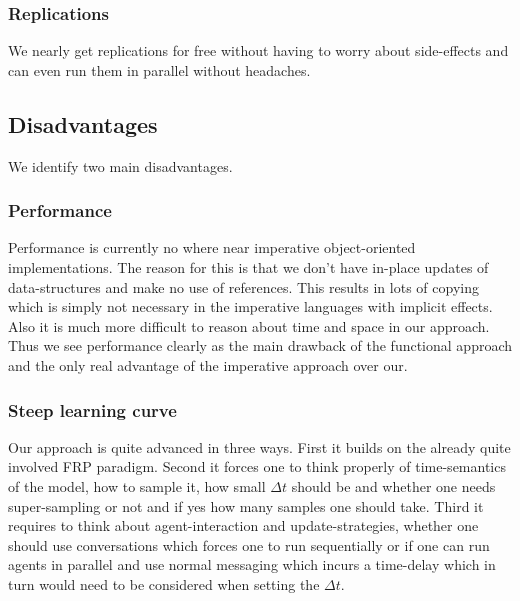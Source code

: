 \subsubsection{Replications}
We nearly get replications for free without having to worry about side-effects and can even run them in parallel without headaches.

\subsection{Disadvantages}
We identify two main disadvantages.

\subsubsection{Performance}
Performance is currently no where near imperative object-oriented implementations. The reason for this is that we don't have in-place updates of data-structures and make no use of references. This results in lots of copying which is simply not necessary in the imperative languages with implicit effects. Also it is much more difficult to reason about time and space in our approach. Thus we see performance clearly as the main drawback of the functional approach and the only real advantage of the imperative approach over our.

\subsubsection{Steep learning curve}
Our approach is quite advanced in three ways. First it builds on the already quite involved FRP paradigm. Second it forces one to think properly of time-semantics of the model, how to sample it, how small $\Delta t$ should be and whether one needs super-sampling or not and if yes how many samples one should take. Third it requires to think about agent-interaction and update-strategies, whether one should use conversations which forces one to run sequentially or if one can run agents in parallel and use normal messaging which incurs a time-delay which in turn would need to be considered when setting the $\Delta t$.